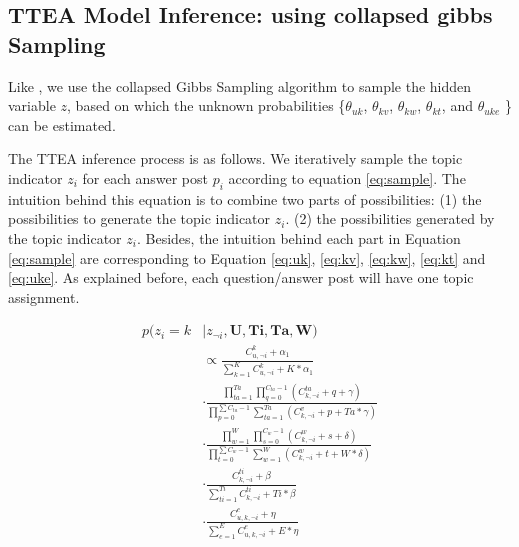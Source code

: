 {{{{{{{\subsection{TTEA Model Inference: using collapsed gibbs Sampling}

Like \cite{hu2014user}, we use the collapsed Gibbs Sampling algorithm \cite{griffiths2004finding} to sample the hidden variable $z$, based on which the unknown probabilities \{$\theta_{uk}$, $\theta_{kv}$, $\theta_{kw}$, $\theta_{kt}$,  and $\theta_{uke}$ \}%
can be estimated. %





The TTEA inference process is as follows.
We iteratively sample the topic indicator $z_i$ for each answer post $p_i$ according to equation \ref{eq:sample}. The intuition behind this equation is to combine two parts of possibilities: (1) the possibilities to generate the topic indicator $z_i$. (2) the possibilities generated by the topic indicator $z_i$. Besides, the intuition behind each part in Equation \ref{eq:sample} are corresponding to Equation \ref{eq:uk}, \ref{eq:kv}, \ref{eq:kw}, \ref{eq:kt} and \ref{eq:uke}. As explained before, each question/answer post will have one topic assignment. 


\begin{equation}
\begin{split}
p(z_i=k & | z_{\neg i}, \textbf{U}, \textbf{Ti}, \textbf{Ta}, \textbf{W}  ) \\
&\propto   \frac{ C_{u,\neg i}^k + \alpha_1 }{ \sum_{k=1}^K C_{u,\neg i}^k+ K* \alpha_1} \\
&\cdot \frac { \prod_{ta=1}^{Ta} \prod_{q=0}^{C_{ta}-1} ( C_{k,\neg i}^{ta} +q+\gamma) } { \prod_{p=0}^{\sum C_{ta} -1} \sum_{ta=1}^{Ta} (C_{k,\neg i}^v + p + Ta*\gamma  ) } \\
&\cdot \frac { \prod_{w=1}^{W} \prod_{s=0}^{C_w-1} ( C_{k,\neg i}^{w} +s+\delta) } { \prod_{t=0}^{\sum C_{w} -1} \sum_{w=1}^W (C_{k,\neg i}^w + t + W*\delta  ) } \\
&\cdot \frac{ C_{k,\neg i}^{ti} + \beta  }{\sum_{ti=1}^{Ti} C_{k,\neg i}^{ti} + Ti*\beta} \\
&\cdot \frac{ C_{u,k,\neg i}^{e} + \eta }{\sum_{e=1}^{E} C_{u,k,\neg i}^{e} + E * \eta}\\
\end{split}
\label{eq:sample}
\end{equation}

}}}}}}}
